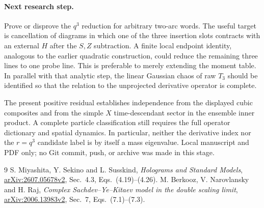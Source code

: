\documentclass[11pt,a4paper]{article}
\begin{document}
\paragraph{Next research step.}
Prove or disprove the $q^3$ reduction for arbitrary two-arc words.
The useful target is cancellation of diagrams in which one of the
three insertion slots contracts with an external $H$ after the
$S,Z$ subtraction. A finite local endpoint identity, analogous to
the earlier quadratic construction, could reduce the remaining
three lines to one probe line. This is preferable to merely
extending the moment table. In parallel with that analytic step,
the linear Gaussian chaos of raw $T_3$ should be identified so
that the relation to the unprojected derivative operator is complete.

The present positive residual establishes independence from the
displayed cubic composites and from the simple $X$ time-descendant
sector in the ensemble inner product. A complete particle
classification still requires the full operator dictionary and
spatial dynamics. In particular, neither the derivative index nor
the $r=q^3$ candidate label is by itself a mass eigenvalue.
Local manuscript and PDF only; no Git commit, push, or archive
was made in this stage.

\begin{thebibliography}{9}
S. Miyashita, Y. Sekino and L. Susskind,
\emph{Holograms and Standard Models},
\href{https://arxiv.org/html/2607.05678v2}{arXiv:2607.05678v2},
Sec.~4.3, Eqs.~(4.19)--(4.26).
M. Berkooz, V. Narovlansky and H. Raj,
\emph{Complex Sachdev--Ye--Kitaev model in the double scaling limit},
\href{https://arxiv.org/html/2006.13983v2}{arXiv:2006.13983v2},
Sec.~7, Eqs.~(7.1)--(7.3).
\end{thebibliography}
\end{document}
